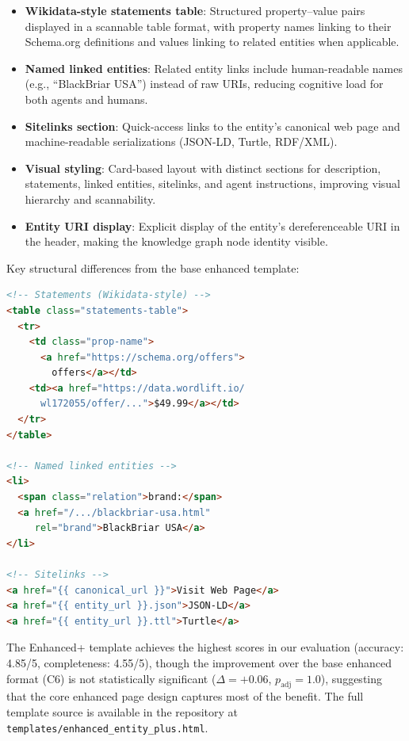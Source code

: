 \documentclass[runningheads]{llncs}
\begin{document}
\begin{itemize}
    \item \textbf{Wikidata-style statements table}: Structured
          property--value pairs displayed in a scannable table format,
          with property names linking to their Schema.org definitions
          and values linking to related entities when applicable.
    \item \textbf{Named linked entities}: Related entity links include
          human-readable names (e.g., ``BlackBriar USA'') instead of
          raw URIs, reducing cognitive load for both agents and humans.
    \item \textbf{Sitelinks section}: Quick-access links to the
          entity's canonical web page and machine-readable serializations
          (JSON-LD, Turtle, RDF/XML).
    \item \textbf{Visual styling}: Card-based layout with distinct
          sections for description, statements, linked entities,
          sitelinks, and agent instructions, improving visual
          hierarchy and scannability.
    \item \textbf{Entity URI display}: Explicit display of the
          entity's dereferenceable URI in the header, making the
          knowledge graph node identity visible.
\end{itemize}

Key structural differences from the base enhanced template:
\begin{lstlisting}[basicstyle=\small\ttfamily,breaklines=true,frame=single,
  language=HTML]
<!-- Statements (Wikidata-style) -->
<table class="statements-table">
  <tr>
    <td class="prop-name">
      <a href="https://schema.org/offers">
        offers</a></td>
    <td><a href="https://data.wordlift.io/
      wl172055/offer/...">$49.99</a></td>
  </tr>
</table>

<!-- Named linked entities -->
<li>
  <span class="relation">brand:</span>
  <a href="/.../blackbriar-usa.html"
     rel="brand">BlackBriar USA</a>
</li>

<!-- Sitelinks -->
<a href="{{ canonical_url }}">Visit Web Page</a>
<a href="{{ entity_url }}.json">JSON-LD</a>
<a href="{{ entity_url }}.ttl">Turtle</a>
\end{lstlisting}

The Enhanced+ template achieves the highest scores in our evaluation
(accuracy: 4.85/5, completeness: 4.55/5), though the improvement over
the base enhanced format (C6) is not statistically significant
($\Delta = +0.06$, $p_\text{adj} = 1.0$), suggesting that the core
enhanced page design captures most of the benefit. The full template
source is available in the repository at
\texttt{templates/enhanced\_entity\_plus.html}.
\end{document}
